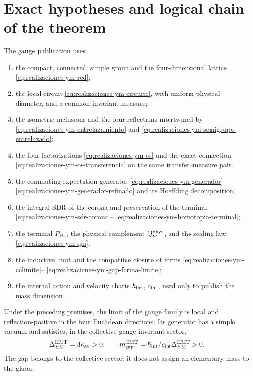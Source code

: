 \section*{Exact hypotheses and logical chain of the theorem}

The gauge publication uses:
\begin{enumerate}
 \item the compact, connected, simple group and the four-dimensional lattice
       \eqref{eq:realizaciones-ym-red};
 \item the local circuit \eqref{eq:realizaciones-ym-circuito}, with uniform
       physical diameter, and a common invariant measure;
 \item the isometric inclusions and the four reflections intertwined by
       \eqref{eq:realizaciones-ym-entrelazamiento} and
       \eqref{eq:realizaciones-ym-semigrupo-entrelazado};
 \item the four factorizations
       \eqref{eq:realizaciones-ym-os} and the exact connection
       \eqref{eq:realizaciones-ym-os-transferencia} on the same
       transfer--measure pair;
 \item the commuting-expectation generator
       \eqref{eq:realizaciones-ym-generador}--
       \eqref{eq:realizaciones-ym-generador-refinado} and its
       Hoeffding decomposition;
 \item the integral SDR of the corona and preservation of the terminal
       \eqref{eq:realizaciones-ym-sdr-corona}--
       \eqref{eq:realizaciones-ym-homotopia-terminal};
 \item the terminal \(P_{\Omega_m}\), the physical complement
       \(Q_m^{\rm phys}\), and the scaling law
       \eqref{eq:realizaciones-ym-qm};
 \item the inductive limit and the compatible closure of forms
       \eqref{eq:realizaciones-ym-colimite}--
       \eqref{eq:realizaciones-ym-gap-forma-limite};
 \item the internal action and velocity charts
       \(\hbar_{\rm int}\), \(c_{\rm int}\), used only to publish the
       mass dimension.
\end{enumerate}

\begin{theorem}
\label{thm:realizaciones-ym}
Under the preceding premises, the limit of the gauge family is local and
reflection-positive in the four Euclidean directions. Its generator
has a simple vacuum and satisfies, in the collective gauge-invariant sector,
\begin{equation}\label{eq:realizaciones-ym-gap-limite}
 \Delta_{\rm YM}^{\rm HMT}=3\kappa_{\rm av}>0,
 \qquad
 m_{\rm gap}^{\rm HMT}
 =\frac{\hbar_{\rm int}}{c_{\rm int}}
  \Delta_{\rm YM}^{\rm HMT}>0.
\end{equation}
The gap belongs to the collective sector; it does not assign an elementary mass to the
gluon.
\end{theorem}

